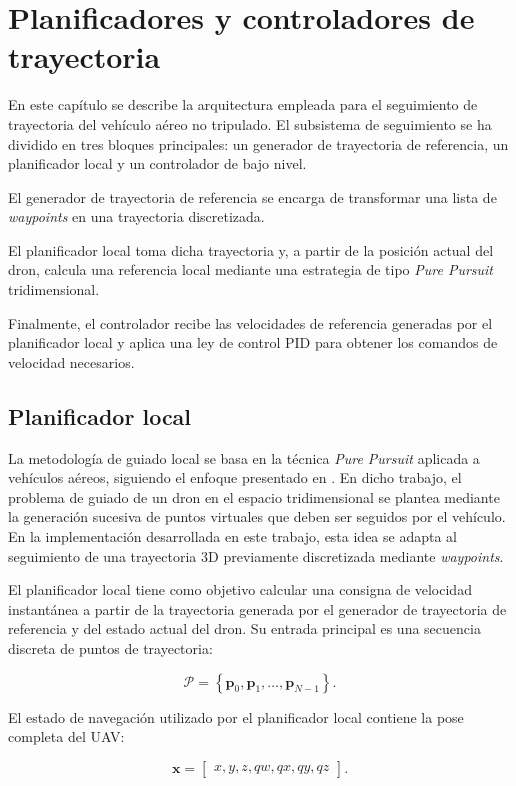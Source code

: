 \chapter{Planificadores y controladores de trayectoria}

En este capítulo se describe la arquitectura empleada para el seguimiento de trayectoria del vehículo aéreo no tripulado. El subsistema 
de seguimiento se ha dividido en tres bloques principales: un generador de trayectoria de referencia, un planificador local y un controlador de bajo nivel.

El generador de trayectoria de referencia se encarga de transformar una lista de \textit{waypoints} en una trayectoria discretizada. 

El planificador local toma dicha trayectoria y, a partir de la posición actual del dron, calcula una referencia local mediante una 
estrategia de tipo \textit{Pure Pursuit} tridimensional. 

Finalmente, el controlador recibe las velocidades de referencia generadas por 
el planificador local y aplica una ley de control PID para obtener los comandos de velocidad necesarios.



\section{Planificador local}
La metodología de guiado local se basa en la técnica \textit{Pure Pursuit} aplicada a vehículos aéreos, siguiendo el enfoque presentado 
en \cite{pp3d}. En dicho trabajo, el problema de guiado de un dron en el espacio tridimensional se plantea mediante la generación 
sucesiva de puntos virtuales que deben ser seguidos por el vehículo. En la implementación desarrollada en este trabajo, esta idea se 
adapta al seguimiento de una trayectoria 3D previamente discretizada mediante \textit{waypoints}.

El planificador local tiene como objetivo calcular una consigna de velocidad instantánea a partir de la trayectoria generada por el 
generador de trayectoria de referencia y del estado actual del dron. Su entrada principal es una secuencia discreta de puntos de trayectoria:

\[\mathcal{P} =\left\{\mathbf{p}_0,\mathbf{p}_1,\dots,\mathbf{p}_{N-1}\right\}.\]


El estado de navegación utilizado por el planificador local contiene la pose completa del UAV:

\[\mathbf{x} =\begin{bmatrix}x ,y ,z ,qw,qx,qy,qz\end{bmatrix}.\]


